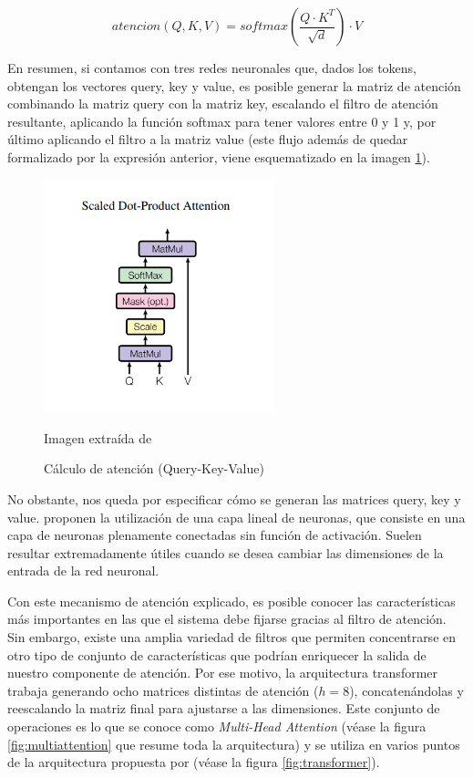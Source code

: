 $$
atencion(Q, K, V)=softmax\left(\frac{Q\cdot K^T}{\sqrt{d}}\right)\cdot V
$$

En resumen, si contamos con tres redes neuronales que, dados los tokens, obtengan los vectores query, key y value, es posible generar la matriz de atención combinando la matriz query con la matriz key, escalando el filtro de atención resultante, aplicando la función softmax para tener valores entre 0 y 1 y, por último aplicando el filtro a la matriz value (este flujo además de quedar formalizado por la expresión anterior, viene esquematizado en la imagen \ref{fig:qkv}).

\begin{figure}[h]
	\centering%
	\centerline{\includegraphics[width = 0.6\textwidth]{Imagenes/Bitmap/scaled-attention.png}}%
	\caption{Cálculo de atención (Query-Key-Value)}%
	Imagen extraída de \cite{transformers}
	\label{fig:qkv}
\end{figure}

No obstante, nos queda por especificar cómo se generan las matrices query, key y value. \cite{transformers} proponen la utilización de una capa lineal de neuronas, que consiste en una capa de neuronas plenamente conectadas sin función de activación. Suelen resultar extremadamente útiles cuando se desea cambiar las dimensiones de la entrada de la red neuronal.

Con este mecanismo de atención explicado, es posible conocer las características más importantes en las que el sistema debe fijarse gracias al filtro de atención. Sin embargo, existe una amplia variedad de filtros que permiten concentrarse en otro tipo de conjunto de características que podrían enriquecer la salida de nuestro componente de atención. Por ese motivo, la arquitectura transformer trabaja generando ocho matrices distintas de atención ($h = 8$), concatenándolas y reescalando la matriz final para ajustarse a las dimensiones. Este conjunto de operaciones es lo que se conoce como \textit{Multi-Head Attention} (véase la figura \ref{fig:multiattention} que resume toda la arquitectura) y se utiliza en varios puntos de la arquitectura propuesta por \cite{transformers} (véase la figura \ref{fig:transformer}).

